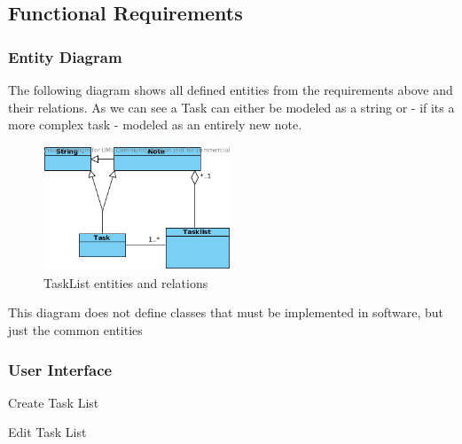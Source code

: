 \subsection{Functional Requirements}
\label{requirements:functional}
    \subsubsection{Entity Diagram}
    The following diagram shows all defined entities from the requirements above and their relations.
    As we can see a Task can either be modeled as a string or - if its a more complex task - modeled as an entirely new note.
    \begin{figure}[h]
	    \centering
        \includegraphics[width=0.5\textwidth]{graphics/entity_diagram.png}
        \caption{TaskList entities and relations}
        \label{entities_relations}
    \end{figure}
    
    This diagram does not define classes that must be implemented in software, but just the common entities



    \subsubsection{User Interface} %
    \label{requirements:interfaces:user}

    \begin{requirement}{Create Task List}
    \end{requirement}

    \begin{requirement}{Edit Task List}
    \end{requirement}

